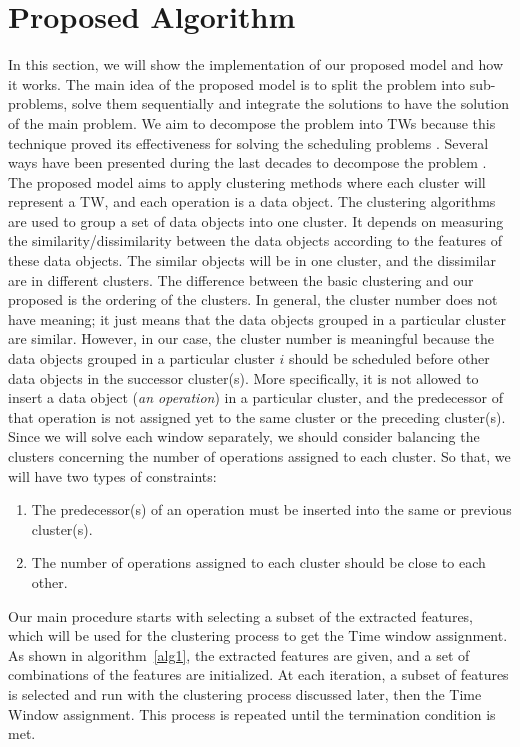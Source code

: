 \documentclass[runningheads]{llncs}
\begin{document}
\section{Proposed Algorithm}
\label{sec:method}
In this section, we will show the implementation of our proposed model and how it works. The main idea of the proposed model is to split the problem into sub-problems, solve them sequentially and integrate the solutions to have the solution of the main problem. We aim to decompose the problem into TWs because this technique proved its effectiveness for solving the scheduling problems \cite{zhang2010hybrid,zhai2014decomposition}. Several ways have been presented during the last decades to decompose the problem \cite{zhai2014decomposition,singer2001decomposition,ovacik2012decomposition,uzsoy2000performance}.\\ 

The proposed model aims to apply clustering methods where each cluster will represent a TW, and each operation is a data object. The clustering algorithms are used to group a set of data objects into one cluster. It depends on measuring the similarity/dissimilarity between the data objects according to the features of these data objects. The similar objects will be in one cluster, and the dissimilar are in different clusters. The difference between the basic clustering and our proposed is the ordering of the clusters. In general, the cluster number does not have meaning; it just means that the data objects grouped in a particular cluster are similar. However, in our case, the cluster number is meaningful because the data objects grouped in a particular cluster $i$ should be scheduled before other data objects in the successor cluster(s). More specifically, it is not allowed to insert a data object (\textit{an operation}) in a particular cluster, and the predecessor of that operation is not assigned yet to the same cluster or the preceding cluster(s). Since we will solve each window separately, we should consider balancing the clusters concerning the number of operations assigned to each cluster. So that, we will have two types of constraints:
\begin{enumerate}
\item The predecessor(s) of an operation must be inserted into the same or previous cluster(s).
\item The number of operations assigned to each cluster should be close to each other.
\end{enumerate}

Our main procedure starts with selecting a subset of the extracted features, which will be used for the clustering process to get the Time window assignment. As shown in algorithm~\ref{alg1}, the extracted features are given, and a set of combinations of the features are initialized. At each iteration, a subset of features is selected and run with the clustering process discussed later, then the Time Window assignment. This process is repeated until the termination condition is met.
\end{document}
